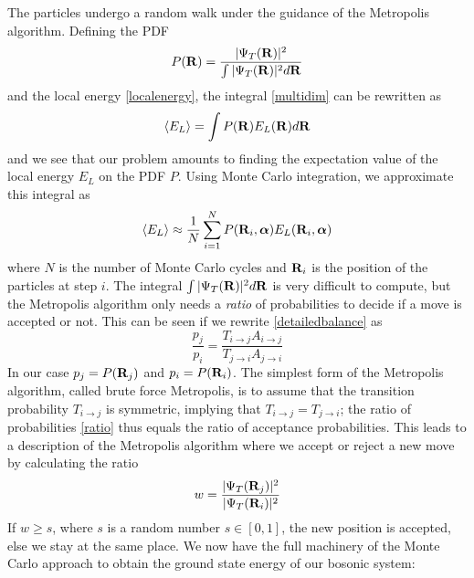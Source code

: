 \documentclass[english, a4paper]{article}
\begin{document}
\noindent The particles undergo a random walk under the guidance of the Metropolis algorithm. 
Defining the PDF 
\begin{equation}
 P({\bf R}) = \frac{|\Psi_T({\bf R})|^2}{\int |\Psi_T({\bf R})|^2 d{\bf R}}
\end{equation}
and the local energy \eqref{localenergy}, the integral \eqref{multidim} can be rewritten as
\begin{equation}
 \langle E_L \rangle = \int P({\bf R}) E_L({\bf R}) d{\bf R}
\end{equation}
and we see that our problem amounts to finding the expectation value of the local energy $E_L$ on the PDF $P$.
Using Monte Carlo integration, we approximate this integral as
\begin{equation}
 \langle E_L \rangle \approx \frac{1}{N} \sum_{i=1}^N P({\bf R}_i, \boldsymbol{\alpha}) E_L({\bf R}_i, \boldsymbol{\alpha})
\end{equation}
where $N$ is the number of Monte Carlo cycles and ${\bf R}_i$ is the position of the particles at step $i$. 
The integral $\int |\Psi_T({\bf R})|^2 d{\bf R}$ is very difficult to compute, but the Metropolis algorithm only needs
a \textit{ratio} of probabilities to decide if a move is accepted or not. This can be seen if we rewrite 
\eqref{detailedbalance} as
\begin{equation}
 \frac{p_j}{p_i} = \frac{T_{i\rightarrow j} A_{i\rightarrow j}}{T_{j\rightarrow i} A_{j\rightarrow i}}
 \label{ratio}
\end{equation}
In our case $p_j = P({\bf R}_j)$ and $p_i = P({\bf R}_i)$. 
The simplest form of the Metropolis algorithm, called brute force Metropolis, is to assume that
the transition probability $T_{i\rightarrow j}$ is symmetric, implying that $T_{i\rightarrow j} = T_{j\rightarrow i}$;
the ratio of probabilities \eqref{ratio} thus equals the ratio of acceptance probabilities. 
This leads to a  description of the Metropolis algorithm where we accept or reject a new 
move by calculating the ratio 
\begin{equation}
 w = \frac{|\Psi_T({\bf R}_j)|^2}{|\Psi_T({\bf R}_i)|^2}
 \label{ratio2}
\end{equation}
If $w \geq s$, where $s$ is a random number $s \in [0,1]$, the new position is accepted, else we stay
at the same place.
We now have the full machinery of the Monte Carlo approach to obtain the ground state energy of our bosonic system:
\end{document}
